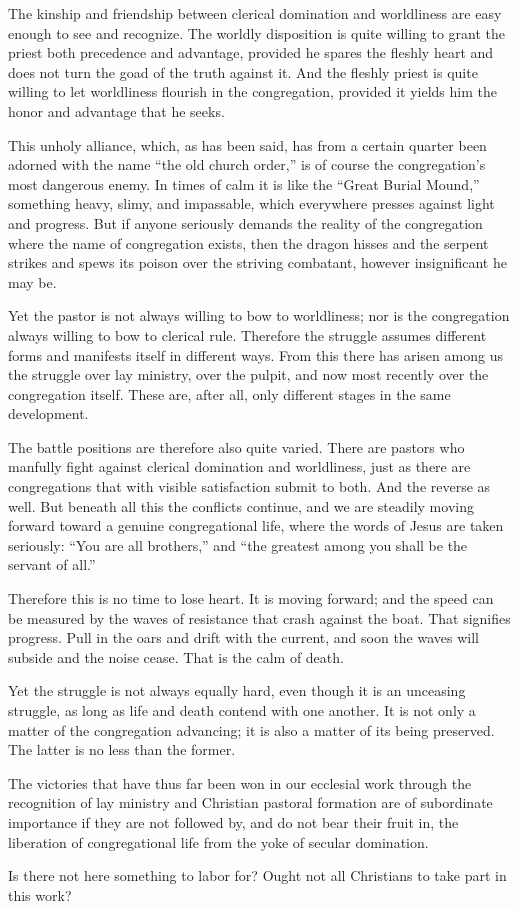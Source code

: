 The kinship and friendship between clerical domination and worldliness are easy enough to see and recognize. The worldly disposition is quite willing to grant the priest both precedence and advantage, provided he spares the fleshly heart and does not turn the goad of the truth against it. And the fleshly priest is quite willing to let worldliness flourish in the congregation, provided it yields him the honor and advantage that he seeks.

This unholy alliance, which, as has been said, has from a certain quarter been adorned with the name “the old church order,” is of course the congregation’s most dangerous enemy. In times of calm it is like the “Great Burial Mound,” something heavy, slimy, and impassable, which everywhere presses against light and progress. But if anyone seriously demands the reality of the congregation where the name of congregation exists, then the dragon hisses and the serpent strikes and spews its poison over the striving combatant, however insignificant he may be.

Yet the pastor is not always willing to bow to worldliness; nor is the congregation always willing to bow to clerical rule. Therefore the struggle assumes different forms and manifests itself in different ways. From this there has arisen among us the struggle over lay ministry, over the pulpit, and now most recently over the congregation itself. These are, after all, only different stages in the same development.

The battle positions are therefore also quite varied. There are pastors who manfully fight against clerical domination and worldliness, just as there are congregations that with visible satisfaction submit to both. And the reverse as well. But beneath all this the conflicts continue, and we are steadily moving forward toward a genuine congregational life, where the words of Jesus are taken seriously: “You are all brothers,” and “the greatest among you shall be the servant of all.”

Therefore this is no time to lose heart. It is moving forward; and the speed can be measured by the waves of resistance that crash against the boat. That signifies progress. Pull in the oars and drift with the current, and soon the waves will subside and the noise cease. That is the calm of death.

Yet the struggle is not always equally hard, even though it is an unceasing struggle, as long as life and death contend with one another. It is not only a matter of the congregation advancing; it is also a matter of its being preserved. The latter is no less than the former.

The victories that have thus far been won in our ecclesial work through the recognition of lay ministry and Christian pastoral formation are of subordinate importance if they are not followed by, and do not bear their fruit in, the liberation of congregational life from the yoke of secular domination.

Is there not here something to labor for? Ought not all Christians to take part in this work?

